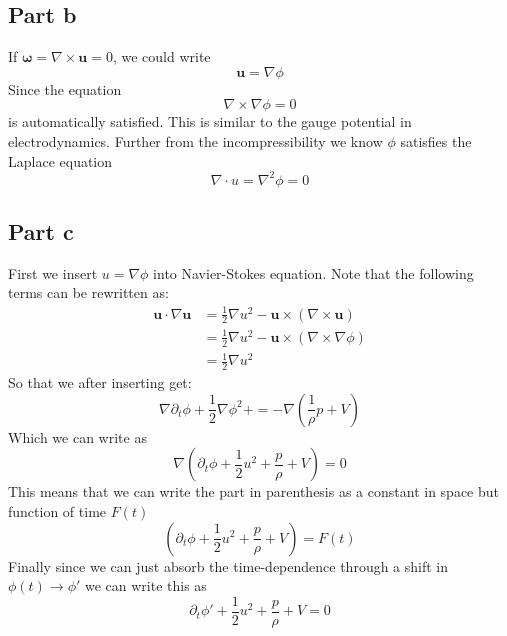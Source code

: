 \documentclass[a4paper,12pt]{article}
\begin{document}
\subsection{Part b}
If $\bm \omega =\nabla\times \bm u =0$, we could write
\begin{equation}
\bm u=\nabla \phi
\end{equation}
Since the equation
\begin{equation}
\nabla\times \nabla\phi =0
\end{equation}
is automatically satisfied. This is similar to the gauge potential in electrodynamics. Further from the incompressibility we know $\phi$ satisfies the Laplace equation
\begin{equation}
\nabla\cdot u=\nabla^2 \phi=0
\end{equation}
\subsection*{Part c}
First we insert $u=\nabla\phi$ into Navier-Stokes equation. Note that the following terms can be rewritten as:
\begin{equation}
\begin{aligned}
\bm u \cdot \nabla\bm u&=\frac{1}{2}\nabla u^2-\bm u\times (\nabla \times \bm u)\\
&=\frac{1}{2}\nabla u^2-\bm u\times (\nabla \times \nabla\phi)\\
&=\frac{1}{2}\nabla u^2
\end{aligned}
\end{equation}
So that we after inserting get:
\begin{equation}
	\nabla \partial_t \phi+ \frac{1}{2}\nabla \phi^2+=-\nabla \left(\frac{1}{\rho} p+ V\right)
\end{equation}
Which we can write as
\begin{equation}
	\nabla \left(\partial_t \phi+\frac{1}{2} u^2+\frac{p}{\rho} + V\right)=0
\end{equation}
This means that we can write the part in parenthesis as a constant in space but function of time $F(t)$
\begin{equation}
 \left(\partial_t \phi+\frac{1}{2} u^2+\frac{p}{\rho} + V\right)=F(t)
\end{equation}
Finally since we can just absorb the time-dependence through a shift in $\phi(t)\to\phi'$ we can write this as
\begin{equation} \label{eq:flow}
\partial_t \phi'+\frac{1}{2} u^2+\frac{p}{\rho} + V=0
\end{equation}
\end{document}
